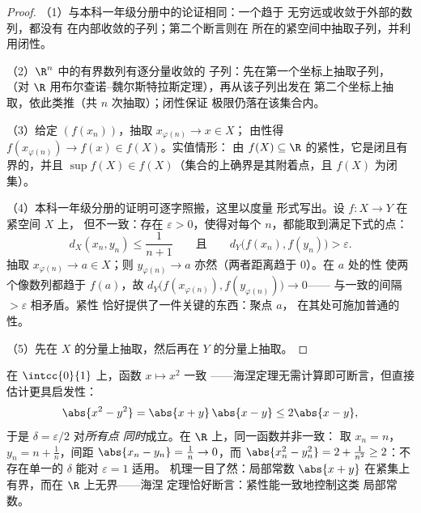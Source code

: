 \begin{proof}
（1）与本科一年级分册中的论证相同：一个趋于%
无穷远或收敛于外部的数列，都没有
在内部收敛的子列；第二个断言则在
所在的紧空间中抽取子列，并利用闭性。

（2）$\R^n$ 中的有界数列有逐分量收敛的
子列：先在第一个坐标上抽取子列，
（对 $\R$ 用布尔查诺–魏尔斯特拉斯定理），再从该子列出发在
第二个坐标上抽取，依此类推（共 $n$ 次抽取）；闭性保证
极限仍落在该集合内。

（3）给定 $(f(x_n))$，抽取 $x_{\varphi(n)} \to x \in X$；
由性得 $f(x_{\varphi(n)}) \to f(x) \in f(X)$。实值情形：
由 $f(X) \subseteq \R$ 的紧性，它是闭且有界的，并且
$\sup f(X) \in f(X)$（集合的上确界是其附着点，且
$f(X)$ 为闭集）。

（4）本科一年级分册的证明可逐字照搬，这里以度量
形式写出。设 $f \colon X \to Y$ 在紧空间 $X$ 上，
但不一致：存在 $\varepsilon > 0$，使得对每个
$n$，都能取到满足下式的点：
\[
d_X(x_n, y_n) \leq \frac{1}{n+1}
\qquad\text{且}\qquad
d_Y\bigl(f(x_n), f(y_n)\bigr) > \varepsilon .
\]
抽取 $x_{\varphi(n)} \to a \in X$；则 $y_{\varphi(n)} \to
a$ 亦然（两者距离趋于 $0$）。在 $a$ 处的性
使两个像数列都趋于 $f(a)$，故
$d_Y\bigl(f(x_{\varphi(n)}), f(y_{\varphi(n)})\bigr) \to 0$——
与一致的间隔 $> \varepsilon$ 相矛盾。紧性
恰好提供了一件关键的东西：聚点 $a$，
在其处可施加普通的性。

（5）先在 $X$ 的分量上抽取，然后再在
$Y$ 的分量上抽取。
\end{proof}

\begin{example}\label{ex:b2:metric:heinework}
在 $\intcc{0}{1}$ 上，函数 $x \mapsto x^2$ 一致
——海涅定理无需计算即可断言，但直接
估计更具启发性：
\[
\abs{x^2 - y^2} = \abs{x + y}\,\abs{x - y} \leq 2\abs{x - y},
\]
于是 $\delta = \varepsilon/2$ 对\emph{所有点
同时}成立。在 $\R$ 上，同一函数并非一致：
取 $x_n = n$，$y_n = n + \frac1n$，间距 $\abs{x_n - y_n}
= \frac1n \to 0$，而 $\abs{x_n^2 - y_n^2} = 2 + \frac1{n^2}
\geq 2$：不存在单一的 $\delta$ 能对 $\varepsilon = 1$ 适用。
机理一目了然：局部常数 $\abs{x + y}$
在紧集上有界，而在 $\R$ 上无界——海涅
定理恰好断言：紧性能一致地控制这类
局部常数。
\end{example}

